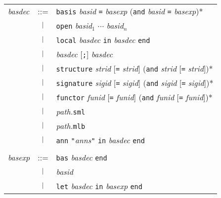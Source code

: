 \begin{latexonly}
\begin{center}
\begin{tabular}{lcl}
{\it basdec} 
& ::=    & {\tt basis} {\it basid} {\tt =} {\it basexp}
            ({\tt and} {\it basid} {\tt =} {\it basexp})* \\
& $\ |\ $ & {\tt open} {\it basid}$_1$ $\cdots$ {\it basid}$_n$ \\
& $\ |\ $ & {\tt local} {\it basdec} {\tt in} {\it basdec} {\tt end} \\
& $\ |\ $ & {\it basdec} [{\tt;}] {\it basdec} \\
& $\ |\ $ & {\tt structure} {\it strid} [{\tt =} {\it strid}] 
                ({\tt and} {\it strid} [{\tt =} {\it strid}])* \\
& $\ |\ $ & {\tt signature} {\it sigid} [{\tt =} {\it sigid}] 
                ({\tt and} {\it sigid} [{\tt =} {\it sigid}])* \\
& $\ |\ $ &   {\tt functor} {\it funid} [{\tt =} {\it funid}] 
                ({\tt and} {\it funid} [{\tt =} {\it funid}])* \\
& $\ |\ $ & {\it path.}{\tt sml} \\
& $\ |\ $ & {\it path.}{\tt mlb} \\
& $\ |\ $ & {\tt ann} {\tt"}{\it anns}{\tt"} {\tt in} {\it basdec} {\tt end} \\
\\
{\it basexp}
& ::=    & {\tt bas} {\it basdec} {\tt end} \\
& $\ |\ $ & {\it basid} \\
& $\ |\ $ & {\tt let} {\it basdec} {\tt in} {\it basexp} {\tt end}
\end{tabular}
\end{center}
\end{latexonly}

